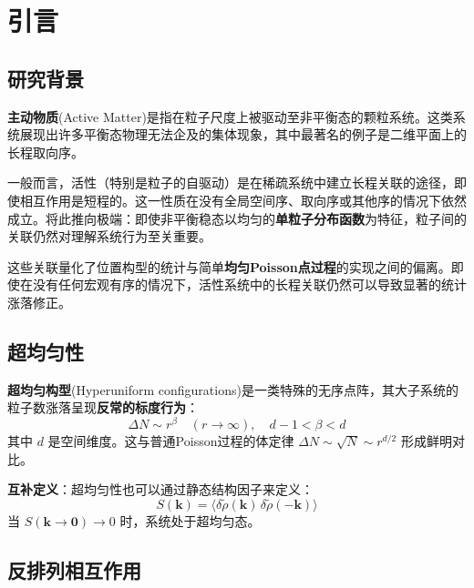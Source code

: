 
\section{引言}\label{sec:intro}

\subsection{研究背景}

\textbf{主动物质}(Active Matter)是指在粒子尺度上被驱动至非平衡态的颗粒系统\cite{boltz2025}。这类系统展现出许多平衡态物理无法企及的集体现象，其中最著名的例子是二维平面上的长程取向序\cite{vicsek1995}。

一般而言，活性（特别是粒子的自驱动）是在稀疏系统中建立长程关联的途径，即使相互作用是短程的。这一性质在没有全局空间序、取向序或其他序的情况下依然成立。将此推向极端：即使非平衡稳态以均匀的\textbf{单粒子分布函数}为特征，粒子间的关联仍然对理解系统行为至关重要。

\begin{notebox}[关键物理图像]
这些关联量化了位置构型的统计与简单\textbf{均匀Poisson点过程}的实现之间的偏离。即使在没有任何宏观有序的情况下，活性系统中的长程关联仍然可以导致显著的统计涨落修正。
\end{notebox}

\subsection{超均匀性}

\textbf{超均匀构型}(Hyperuniform configurations)\cite{torquato2018}是一类特殊的无序点阵，其大子系统的粒子数涨落呈现\textbf{反常的标度行为}：
\begin{equation}\label{eq:hyperuniform-def}
\Delta N \sim r^\beta \quad (r \to \infty), \quad d-1 < \beta < d
\end{equation}
其中 $d$ 是空间维度。这与普通Poisson过程的体定律 $\Delta N \sim \sqrt{N} \sim r^{d/2}$ 形成鲜明对比。

\textbf{互补定义}：超均匀性也可以通过静态结构因子来定义：
\begin{equation}\label{eq:structure-factor-def}
S(\mathbf{k}) = \langle \delta\tilde{\rho}(\mathbf{k})\, \delta\tilde{\rho}(-\mathbf{k}) \rangle
\end{equation}
当 $S(\mathbf{k} \to \mathbf{0}) \to 0$ 时，系统处于超均匀态。

\subsection{反排列相互作用}

